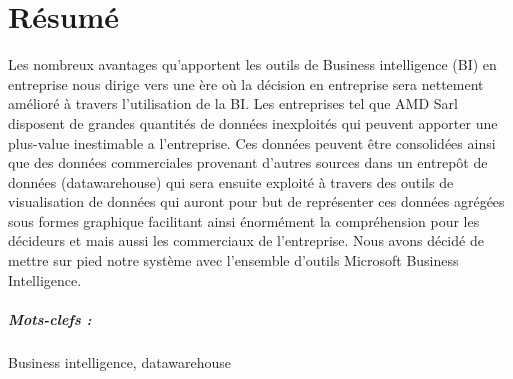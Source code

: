 \chapter*{Résumé}%
%
Les nombreux avantages qu’apportent les outils de Business intelligence (BI) en entreprise nous dirige vers une ère où la décision en entreprise sera nettement amélioré à travers l’utilisation de la BI. Les entreprises tel que AMD Sarl disposent de grandes quantités de données inexploités qui peuvent apporter une plus-value inestimable a l’entreprise. Ces données peuvent être consolidées ainsi que des données commerciales provenant d’autres sources dans un entrepôt de données (datawarehouse) qui sera ensuite exploité à travers des outils de visualisation de données qui auront pour but de représenter ces données agrégées sous formes graphique facilitant ainsi énormément la compréhension pour les décideurs et mais aussi les commerciaux de l’entreprise. Nous avons décidé de mettre sur pied notre système avec l’ensemble d’outils Microsoft Business Intelligence.

\paragraph{Mots-clefs :}Business intelligence, datawarehouse